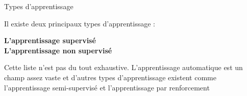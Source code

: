\documentclass[10pt]{beamer}
\newcommand{\hsp}{\hspace*{1em}}
\begin{document}

\begin{frame}{Types d'apprentissage}
	
Il existe deux principaux types d'apprentissage : \\[4em]
	
	\begin{center}
		
		 \hsp \textbf{L'apprentissage supervisé}\\[3em]
		 \hsp \textbf{L'apprentissage non supervisé}\\[4em]
		
		 \end{center}
	 		
		Cette liste n'est pas du tout exhaustive. L'apprentissage automatique est un champ assez vaste et d'autres types d'apprentissage existent comme \eg l'apprentissage semi-supervisé et l'apprentissage par renforcement
\end{frame}


\end{document}

